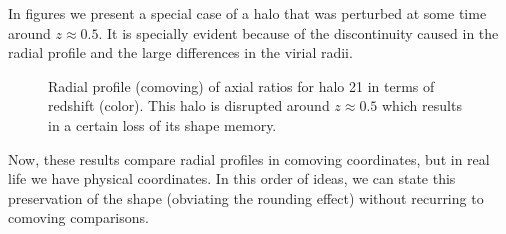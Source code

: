 In figures \label{fig:RedshiftDMbad} we present a special case of a halo that was perturbed at some time around $z\approx 0.5$. It is specially evident because of the discontinuity caused in the radial profile and the large differences in the virial radii.  \\  


\begin{figure}[!ht]
  \centering
  \hfill
  \caption{Radial profile (comoving) of axial ratios for halo 21 in terms of redshift (color). This halo is disrupted around $z \approx 0.5$ which results in a certain loss of its shape memory.}
  \label{fig:RedshiftBad}
\end{figure}

Now, these results compare radial profiles in comoving coordinates, but in real life we have physical coordinates. In this order of ideas, we can state this preservation of the shape (obviating the rounding effect) without recurring to comoving comparisons.\\

